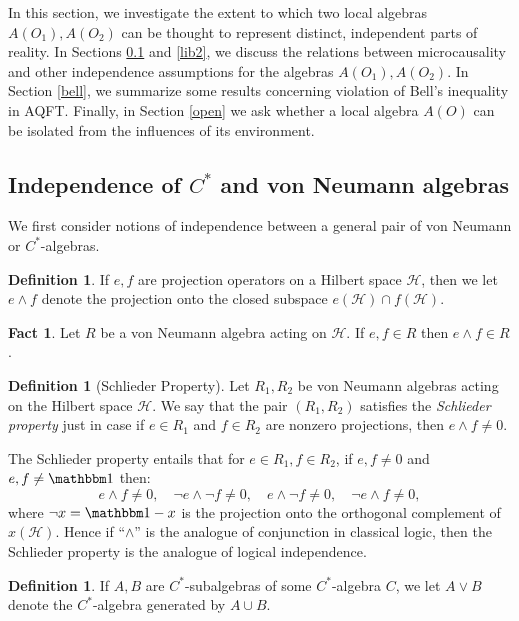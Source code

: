 \documentclass[11pt]{article}
\theoremstyle{definition}
\newtheorem{fact}[thm]{Fact}
\theoremstyle{definition}
\newtheorem{defn}[thm]{Definition}
\theoremstyle{remark}
\def\2#1{{\mathcal #1}}
\def\8#1{{\mathbbm #1}}
\begin{document}
In this section, we investigate the extent to which two local algebras
$A(O_1),A(O_2)$ can be thought to represent distinct, independent
parts of reality.  In Sections \ref{liberty} and \ref{lib2}, we
discuss the relations between microcausality and other independence
assumptions for the algebras $A(O_1),A(O_2)$.  In Section \ref{bell},
we summarize some results concerning violation of Bell's inequality in
AQFT.  Finally, in Section \ref{open} we ask whether a local algebra
$A(O)$ can be isolated from the influences of its environment.

\subsection{Independence of $C^*$ and von Neumann algebras}
\label{liberty}

We first consider notions of independence between a general pair of
von Neumann or $C^*$-algebras.

\begin{defn} If $e,f$ are projection operators on a Hilbert space
  $\2H$, then we let $e\wedge f$ denote the projection onto the closed
  subspace $e(\2H )\cap f(\2H )$.  \end{defn}

\begin{fact} Let $R$ be a von Neumann algebra acting on $\2H$.  If
  $e,f\in R$ then $e\wedge f\in R$.  \end{fact}

\begin{defn}[Schlieder Property] Let $R_1,R_2$ be von Neumann algebras
  acting on the Hilbert space $\2H$.  We say that the pair $(R_1,R_2)$
  satisfies the \emph{Schlieder property} just in case if $e\in R_1$
  and $f\in R_2$ are nonzero projections, then $e\wedge f\neq 0$.
\end{defn}

\noindent The Schlieder property entails that for $e\in R_1 ,f\in
R_2$, if $e,f\neq 0$ and $e,f\neq \81$ then:
$$ e\wedge f\neq 0,\quad \neg e\wedge \neg f \neq 0,\quad e\wedge \neg
f\neq 0, \quad \neg e \wedge f\neq 0 ,$$ where $\neg x=\81 -x$ is the
projection onto the orthogonal complement of $x(\2H )$.  Hence if
``$\wedge$'' is the analogue of conjunction in classical logic, then
the Schlieder property is the analogue of logical independence.

\begin{defn} If $A,B$ are $C^*$-subalgebras of some $C^*$-algebra $C$,
  we let $A\vee B$ denote the $C^*$-algebra generated by $A\cup B$.
\end{defn}
\end{document}
